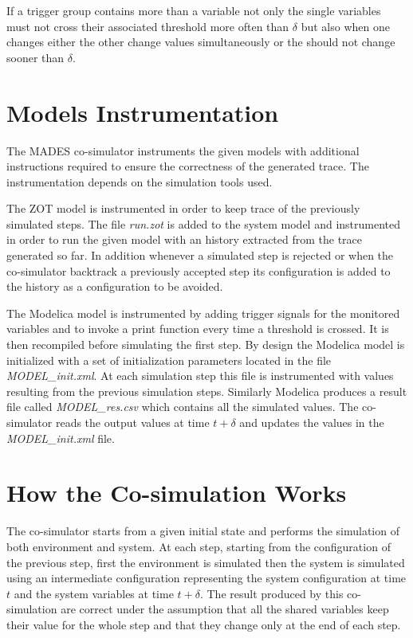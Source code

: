 \documentclass{kapproc} %
\begin{document}
If a trigger group contains more than a variable not only the single variables must
not cross their associated threshold more often than $\delta$ but also when one changes either the other change values simultaneously or the should not change sooner than $\delta$.

\section{Models Instrumentation}
\label{section:models-instrumentation}

The MADES co-simulator instruments the given models with additional
instructions required to ensure the correctness of the generated trace. The instrumentation depends on the simulation tools used.

The ZOT model is instrumented in order to keep trace of the previously simulated 
steps. The file \emph{run.zot} is added to the system model and instrumented in order to run the given model with an history extracted from the trace generated so far. In addition whenever a simulated step is rejected or when the co-simulator 
backtrack a previously accepted step its configuration is added to the history
as a configuration to be avoided.

The Modelica model is instrumented by adding trigger signals for the monitored variables and to invoke a print function every time a threshold is crossed. It is then recompiled before simulating the first step. By design the Modelica model is initialized with a set of initialization parameters located in the file
\emph{MODEL\_init.xml}. At each simulation step this file is instrumented with values resulting from the previous simulation steps. Similarly Modelica produces a
result file called \emph{MODEL\_res.csv} which contains all the simulated values. The co-simulator reads the output values at time $t + \delta$ and updates the values in the \emph{MODEL\_init.xml} file.

\section{How the Co-simulation Works}

The co-simulator starts from a given initial state and performs the simulation of both environment and system. At each step, starting from the configuration of the previous step, first the environment is simulated then the system is simulated using an intermediate configuration representing the system configuration at time $t$ and the system variables at time $t + \delta$. The result produced by this co-simulation
are correct under the assumption that all the shared variables keep their value for the whole step and that they change only at the end of each step.
\end{document}
